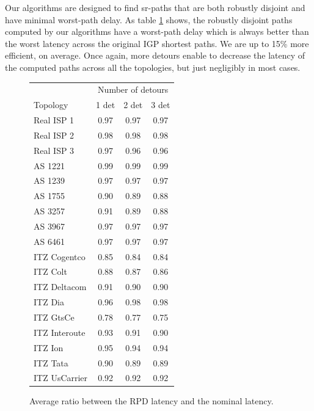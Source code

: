 Our algorithms are designed to find sr-paths that are both
robustly disjoint and have minimal worst-path delay. As 
table \ref{tab:rdp_lat} shows, the robustly disjoint paths computed by our
algorithms have a worst-path delay which is always better than
the worst latency across the original IGP shortest paths. We are
up to 15\% more efficient, on average. Once again, more detours
enable to decrease the latency of the computed paths across all the
topologies, but just negligibly in most cases.

\begin{figure}
\begin{center}
\begin{tabular}{ l | c c c }
  \toprule
  & \multicolumn{3}{c}{Number of detours} \\
  Topology &  1 det & 2 det & 3 det \\
  \midrule
  Real ISP 1 & 0.97 & 0.97 & 0.97 \\
  Real ISP 2 & 0.98 & 0.98 & 0.98  \\
  Real ISP 3 & 0.97 & 0.96 & 0.96  \\
  \midrule
  AS 1221 & 0.99 & 0.99 & 0.99 \\
  AS 1239 & 0.97 & 0.97 & 0.97  \\
  AS 1755 & 0.90 & 0.89 & 0.88  \\
  AS 3257 & 0.91 & 0.89 & 0.88\\
  AS 3967 & 0.97 & 0.97 & 0.97  \\
  AS 6461 & 0.97 & 0.97 & 0.97  \\
  \midrule
  ITZ Cogentco & 0.85 & 0.84 & 0.84  \\ 
  ITZ Colt & 0.88 & 0.87 & 0.86  \\
  ITZ Deltacom & 0.91 & 0.90 & 0.90  \\
  ITZ Dia & 0.96 & 0.98 & 0.98  \\
  ITZ GtsCe & 0.78 & 0.77 & 0.75 \\
  ITZ Interoute & 0.93 & 0.91 & 0.90   \\
  ITZ Ion & 0.95 & 0.94 & 0.94  \\
  ITZ Tata & 0.90 & 0.89 & 0.89  \\
  ITZ UsCarrier & 0.92 & 0.92 & 0.92   \\
  \bottomrule
\end{tabular}
\end{center}
\caption{Average ratio between the RPD latency and the nominal latency.}
\label{tab:rdp_lat}
\end{figure}

